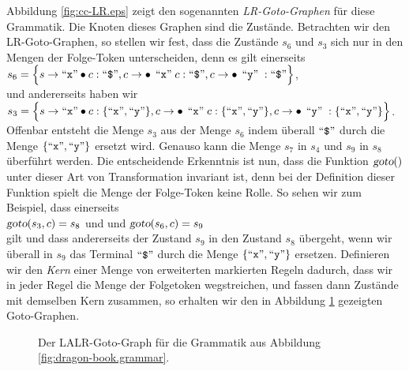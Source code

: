 Abbildung \ref{fig:cc-LR.eps} zeigt den sogenannten \emph{LR-Goto-Graphen} f\"ur diese Grammatik.
Die Knoten dieses Graphen sind die Zust\"ande.  
Betrachten wir den LR-Goto-Graphen, so stellen wir fest, dass die Zust\"ande $s_6$ und
$s_3$ sich nur in den Mengen der Folge-Token unterscheiden, denn es gilt einerseits
\\[0.2cm]
\hspace*{1.3cm}
$s_6 = \Bigl\{ s \rightarrow \squoted{x} \bullet c: \squoted{\symbol{36}}, 
                 c \rightarrow \bullet\, \quoted{x} c:  \squoted{\symbol{36}},
                 c \rightarrow \bullet\, \quoted{y}:    \squoted{\symbol{36}}
       \Bigr\}$, 
\\[0.2cm]
und andererseits haben wir
\\[0.2cm]
\hspace*{1.3cm}
$s_3 = \Bigl\{ s \rightarrow \mbox{``\texttt{x}''} \bullet c: \{ \mbox{``\texttt{x}''}, \mbox{``\texttt{y}''} \}, 
                 c \rightarrow \bullet\, \;\mbox{``\texttt{x}''}\; c:  \{ \mbox{``\texttt{x}''}, \mbox{``\texttt{y}''} \},
                 c \rightarrow \bullet\, \;\mbox{``\texttt{y}''}\;:    \{ \mbox{``\texttt{x}''}, \mbox{``\texttt{y}''} \}  
       \Bigr\}$.
\\[0.2cm]
Offenbar entsteht die Menge $s_3$ aus der Menge $s_6$ indem \"uberall $\squoted{\symbol{36}}$
durch die Menge $\{ \mbox{``\texttt{x}''}, \mbox{``\texttt{y}''}\}$ ersetzt wird.  Genauso kann die Menge $s_7$ in $s_4$
und $s_9$ in $s_8$ \"uberf\"uhrt werden.  Die entscheidende Erkenntnis ist nun, dass die
Funktion $\textsl{goto}()$ unter dieser Art von Transformation invariant ist, denn bei der
Definition dieser Funktion spielt die Menge der Folge-Token keine Rolle.  So sehen wir zum
Beispiel, dass einerseits
\\[0.2cm]
\hspace*{1.3cm}
$\textsl{goto}(s_3, c) = s_8$ \quad und \quad und 
$\textsl{goto}(s_6, c) = s_9$ 
\\[0.2cm]
gilt und dass andererseits der Zustand $s_9$ in den Zustand $s_8$ \"ubergeht, wenn wir
\"uberall in $s_9$ das Terminal $\squoted{\symbol{36}}$ durch die Menge 
 $\{ \mbox{``\texttt{x}''}, \mbox{``\texttt{y}''}\}$ ersetzen.  Definieren wir den \emph{Kern}
einer Menge von erweiterten markierten Regeln dadurch, dass wir in jeder Regel die Menge
der Folgetoken wegstreichen, und fassen dann Zust\"ande mit demselben Kern zusammen, so
erhalten wir den in 
Abbildung \ref{fig:cc-LALR.eps} gezeigten Goto-Graphen.

\begin{figure}[!ht]
\centering
  \hspace*{-0.6cm} 
  \caption{Der LALR-Goto-Graph f\"ur die Grammatik aus Abbildung \ref{fig:dragon-book.grammar}.}
  \label{fig:cc-LALR.eps}
\end{figure}

